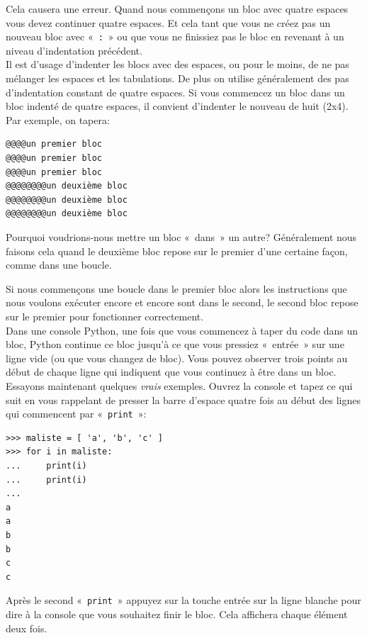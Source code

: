 Cela causera une erreur. Quand nous commençons un bloc avec quatre espaces vous devez continuer quatre espaces. Et cela tant que vous ne créez pas un nouveau bloc avec « \verb+:+ » ou que vous ne finissiez pas le bloc en revenant à un niveau d'indentation précédent.\\

Il est d'usage d'indenter les blocs avec des espaces, ou pour le moins, de ne pas mélanger les espaces et les tabulations. De plus on utilise généralement des pas d'indentation constant de quatre espaces.
Si vous commencez un bloc dans un bloc indenté de quatre espaces, il convient d'indenter le nouveau de huit (2x4).
Par exemple, on tapera:

\begin{Verbatim}[frame=single,rulecolor=\color{gray}, label=ne pas saisir]
@@@@un premier bloc
@@@@un premier bloc
@@@@un premier bloc
@@@@@@@@un deuxième bloc
@@@@@@@@un deuxième bloc
@@@@@@@@un deuxième bloc
\end{Verbatim}

Pourquoi voudrions-nous mettre un bloc « dans » un autre? Généralement nous faisons cela quand le deuxième bloc repose sur le premier d'une certaine façon, comme dans une boucle.

Si nous commençons une boucle dans le premier bloc alors les instructions que nous voulons exécuter encore et encore sont dans le second, le second bloc repose sur le premier pour fonctionner correctement.\\

Dans une console Python, une fois que vous commencez à taper du code dans un bloc, Python continue ce bloc jusqu'à ce que vous pressiez « entrée » sur une ligne vide (ou que vous changez de bloc). Vous pouvez observer trois points au début de chaque ligne qui indiquent que vous continuez à être dans un bloc.\\

Essayons maintenant quelques \emph{vrais} exemples. Ouvrez la console et tapez ce qui suit en vous rappelant de presser la barre d'espace quatre fois au début des lignes qui commencent par « \texttt{print} »:

\begin{Verbatim}[frame=single,rulecolor=\color{green}, label=à saisir avec attention]
>>> maliste = [ 'a', 'b', 'c' ]
>>> for i in maliste:
...     print(i)
...     print(i)
...
a
a
b
b
c
c
\end{Verbatim} 

Après le second « \texttt{print} » appuyez sur la touche entrée sur la ligne blanche pour dire à la console que vous souhaitez finir le bloc. Cela affichera chaque élément deux fois.\\

